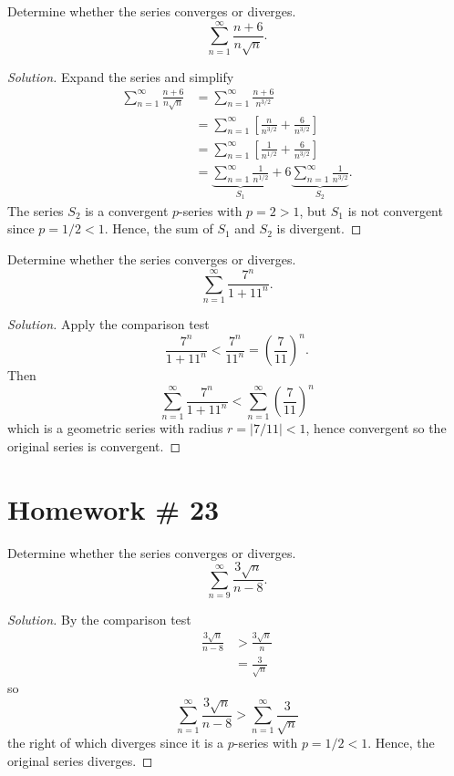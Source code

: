 \begin{problem}[WebAssign HW \# 22, \# 8]
Determine whether the series converges or diverges.
\[
\sum_{n=1}^\infty\frac{n+6}{n\sqrt{n}}.
\]
\end{problem}
\begin{proof}[Solution]
Expand the series and simplify
\begin{align*}
\sum_{n=1}^\infty\frac{n+6}{n\sqrt{n}}
&=\sum_{n=1}^\infty\frac{n+6}{n^{3/2}}\\
&=\sum_{n=1}^\infty\left[\frac{n}{n^{3/2}}+\frac{6}{n^{3/2}}\right]\\
&=\sum_{n=1}^\infty\left[\frac{1}{n^{1/2}}+\frac{6}{n^{3/2}}\right]\\
&=\underbrace{\sum_{n=1}^\infty\frac{1}{n^{1/2}}}_{S_1}
+6\underbrace{\sum_{n=1}^\infty\frac{1}{n^{3/2}}}_{S_2}.
\end{align*}
The series $S_2$ is a convergent $p$-series with $p=2>1$, but $S_1$ is not
convergent since $p=1/2<1$. Hence, the sum of $S_1$ and $S_2$ is
divergent.
\end{proof}

\begin{problem}[WebAssign HW \# 22, \# 9]
Determine whether the series converges or diverges.
\[
\sum_{n=1}^\infty\frac{7^n}{1+11^n}.
\]
\end{problem}
\begin{proof}[Solution]
Apply the comparison test
\[
\frac{7^n}{1+11^n}<\frac{7^n}{11^n}=\left(\frac{7}{11}\right)^n.
\]
Then
\[
\sum_{n=1}^\infty\frac{7^n}{1+11^n}<\sum_{n=1}^\infty\left(\frac{7}{11}\right)^n
\]
which is a geometric series with radius $r=|7/11|<1$, hence convergent so
the original series is convergent.
\end{proof}

\section{Homework \# 23}
\begin{problem}[WebAssign HW \# 23, \# 1]
Determine whether the series converges or diverges.
\[
\sum_{n=9}^\infty\frac{3\sqrt{n}}{n-8}.
\]
\end{problem}
\begin{proof}[Solution]
By the comparison test
\begin{align*}
\frac{3\sqrt{n}}{n-8}&>\frac{3\sqrt{n}}{n}\\
                     &=\frac{3}{\sqrt{n}}
\end{align*}
so
\[
\sum_{n=1}^\infty\frac{3\sqrt{n}}{n-8}>\sum_{n=1}^\infty\frac{3}{\sqrt{n}}
\]
the right of which diverges since it is a $p$-series with $p=1/2<1$. Hence,
the original series diverges.
\end{proof}

